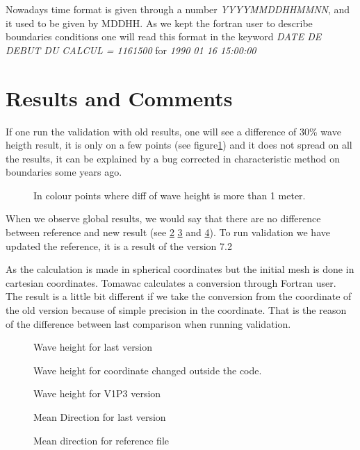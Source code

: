 Nowadays time format is given through a number \textit{YYYYMMDDHHMMNN}, and it used to be given by MDDHH. 
As we kept the fortran user to describe boundaries conditions one will read this format in the keyword \textit{DATE DE DEBUT DU CALCUL = 1161500} for \textit{1990 01 16 15:00:00}

\section{Results and Comments}

If one run the validation with old results, one will see a difference of 30\% wave heigth result, it is only on a few points (see figure\ref{figmanchedif}) and it does not spread on all the results, it can be explained by a bug corrected in characteristic method on boundaries some years ago. 
\begin{figure} [!h]
\centering
{}
 \caption{In colour points where diff of wave height is more than 1 meter.}
\label{figmanchedif}
\end{figure}

When we observe global results, we would say that there are no difference between reference and new result (see \ref{figmanchehm0} \ref{figmanchehm02} and \ref{figmanchehm0v1P3}). To run validation we have updated the reference, it is a result of the version 7.2

As the calculation is made in spherical coordinates but the initial mesh is done in cartesian coordinates. Tomawac calculates a conversion through Fortran user. The result is a little bit different if we take the conversion from the coordinate of the old version because of simple precision in the coordinate. That is the reason of the difference between last comparison when running validation.  

\begin{figure} [!h]
\centering
{}
 \caption{Wave height for last version}
\label{figmanchehm0}
\end{figure}
\begin{figure} [!h]
\centering
{}
 \caption{Wave height for coordinate changed outside the code.}
\label{figmanchehm02}
\end{figure}
\begin{figure} [!h]
\centering
{}
 \caption{Wave height for V1P3 version}
\label{figmanchehm0v1P3}
\end{figure}
\begin{figure} [!h]
\centering
{}
 \caption{Mean Direction for last version}
\label{figmanchedirection}
\end{figure}
\begin{figure} [!h]
\centering
{}
 \caption{Mean direction for reference file}
\label{figmanchedirectionref}
\end{figure}
